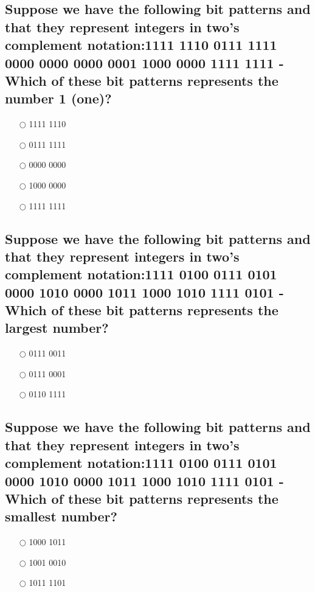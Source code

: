 \documentclass[a4paper,11pt,oneside]{article}
\begin{document}
\begin{sloppypar}
\subsection{Suppose we have the following bit patterns and that they represent integers in two's complement notation:1111 1110 0111 1111 0000 0000 0000 0001 1000 0000 1111 1111 - Which of these bit patterns represents the number 1 (one)?}

\label{q:3500001:mc:en:True}

\begin{itemize}
  \item[$\bigcirc$] 1111 1110
  \item[$\bigcirc$] 0111 1111
  \item[$\bigcirc$] 0000 0000
  \item[$\bigcirc$] 1000 0000
  \item[$\bigcirc$] 1111 1111
\end{itemize}



\subsection{Suppose we have the following bit patterns and that they represent integers in two's complement notation:1111 0100 0111 0101 0000 1010 0000 1011 1000 1010 1111 0101 - Which of these bit patterns represents the largest number?}

\label{q:35100:mc:en:True}

\begin{itemize}
  \item[$\bigcirc$] 0111 0011
  \item[$\bigcirc$] 0111 0001
  \item[$\bigcirc$] 0110 1111
\end{itemize}

\subsection{Suppose we have the following bit patterns and that they represent integers in two's complement notation:1111 0100 0111 0101 0000 1010 0000 1011 1000 1010 1111 0101 - Which of these bit patterns represents the smallest number?}

\label{q:3510001:mc:en:True}

\begin{itemize}
  \item[$\bigcirc$] 1000 1011
  \item[$\bigcirc$] 1001 0010
  \item[$\bigcirc$] 1011 1101
\end{itemize}




\end{sloppypar}
\end{document}
